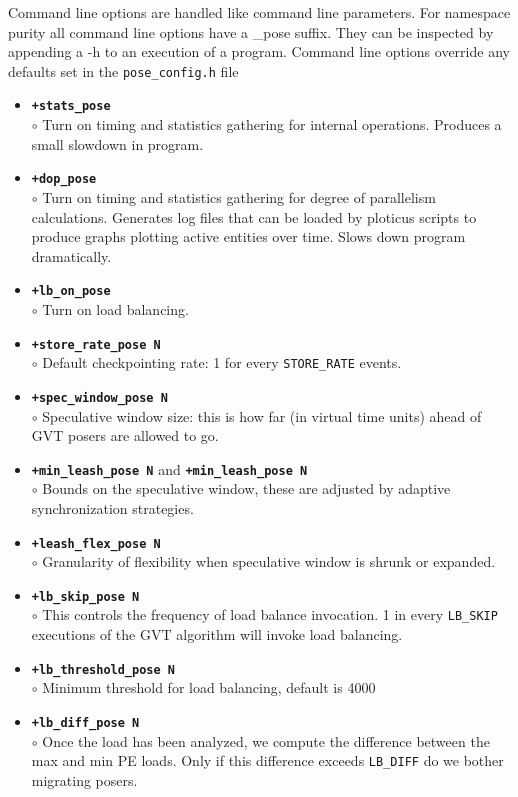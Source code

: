 Command line options are handled like \charmpp{} command line
parameters.  For namespace purity all \pose{} command line options
have a \_pose suffix.  They can be inspected by appending a -h to an
execution of a \pose{} program.  Command line options override any
defaults set in the {\tt pose\_config.h} file

\begin{itemize}
\item {\tt {\bf +stats\_pose}}\\
	$\circ$ Turn on timing and statistics gathering for internal \pose{}
	operations.  Produces a small slowdown in program.\\
\item {\tt {\bf +dop\_pose}}\\
	$\circ$ Turn on timing and statistics gathering for degree of parallelism calculations.  Generates log files that can be loaded by ploticus scripts to produce graphs plotting active entities over time.  Slows down program dramatically.\\
\item {\tt {\bf +lb\_on\_pose}}\\
	$\circ$ Turn on \pose{} load balancing.\\
\item {\tt {\bf +store\_rate\_pose N}}\\
	$\circ$ Default checkpointing rate: 1 for every {\tt STORE\_RATE} events.\\
\item {\tt {\bf +spec\_window\_pose N}}\\
	$\circ$ Speculative window size: this is how far (in virtual time units) ahead of GVT posers are allowed to go.\\
\item {\tt {\bf +min\_leash\_pose N}} and {\tt {\bf +min\_leash\_pose N}}\\
	$\circ$ Bounds on the speculative window, these are adjusted by adaptive synchronization strategies.\\
\item {\tt {\bf +leash\_flex\_pose N}}\\
	$\circ$ Granularity of flexibility when speculative window is shrunk or expanded.\\
\item {\tt {\bf +lb\_skip\_pose N}}\\
	$\circ$ This controls the frequency of load balance invocation.  1 in every {\tt LB\_SKIP} executions of the GVT algorithm will invoke load balancing.
\item {\tt {\bf +lb\_threshold\_pose N}}\\
	$\circ$ Minimum threshold for load balancing, default is 4000
\item {\tt {\bf +lb\_diff\_pose N}}\\
	$\circ$ Once the load has been analyzed, we compute the difference between the max and min PE loads.  Only if this difference exceeds {\tt LB\_DIFF} do we bother migrating posers.\\
\end{itemize}

